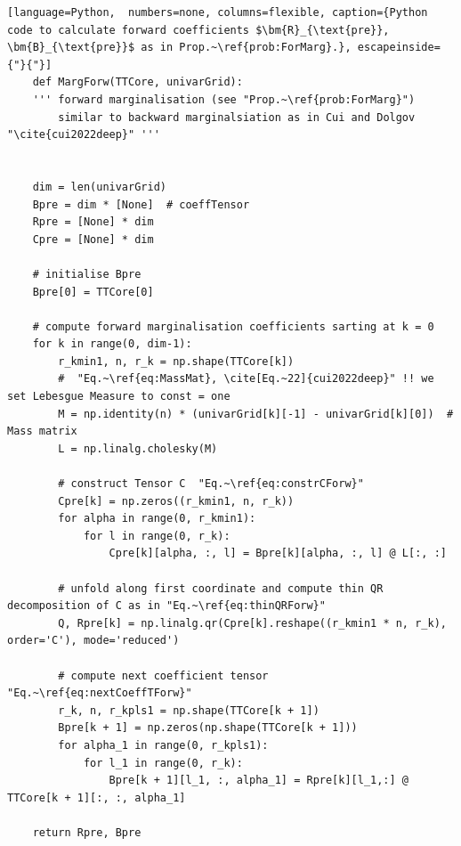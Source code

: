 \begin{lstlisting}[language=Python,  numbers=none, columns=flexible, caption={Python code to calculate forward coefficients $\bm{R}_{\text{pre}}, \bm{B}_{\text{pre}}$ as in Prop.~\ref{prob:ForMarg}.}, escapeinside={"}{"}]
	def MargForw(TTCore, univarGrid):
	''' forward marginalisation (see "Prop.~\ref{prob:ForMarg}") 
		similar to backward marginalsiation as in Cui and Dolgov "\cite{cui2022deep}" '''
	

	dim = len(univarGrid)
	Bpre = dim * [None]  # coeffTensor
	Rpre = [None] * dim
	Cpre = [None] * dim
	
	# initialise Bpre
	Bpre[0] = TTCore[0]
	
	# compute forward marginalisation coefficients sarting at k = 0
	for k in range(0, dim-1):
		r_kmin1, n, r_k = np.shape(TTCore[k])
		#  "Eq.~\ref{eq:MassMat}, \cite[Eq.~22]{cui2022deep}" !! we set Lebesgue Measure to const = one
		M = np.identity(n) * (univarGrid[k][-1] - univarGrid[k][0])  # Mass matrix
		L = np.linalg.cholesky(M)
		
		# construct Tensor C  "Eq.~\ref{eq:constrCForw}"
		Cpre[k] = np.zeros((r_kmin1, n, r_k))
		for alpha in range(0, r_kmin1):
			for l in range(0, r_k):
				Cpre[k][alpha, :, l] = Bpre[k][alpha, :, l] @ L[:, :]
		
		# unfold along first coordinate and compute thin QR decomposition of C as in "Eq.~\ref{eq:thinQRForw}"
		Q, Rpre[k] = np.linalg.qr(Cpre[k].reshape((r_kmin1 * n, r_k), order='C'), mode='reduced')
		
		# compute next coefficient tensor  "Eq.~\ref{eq:nextCoeffTForw}"
		r_k, n, r_kpls1 = np.shape(TTCore[k + 1])
		Bpre[k + 1] = np.zeros(np.shape(TTCore[k + 1]))
		for alpha_1 in range(0, r_kpls1):
			for l_1 in range(0, r_k):
				Bpre[k + 1][l_1, :, alpha_1] = Rpre[k][l_1,:] @ TTCore[k + 1][:, :, alpha_1]
		
	return Rpre, Bpre
	
\end{lstlisting}


